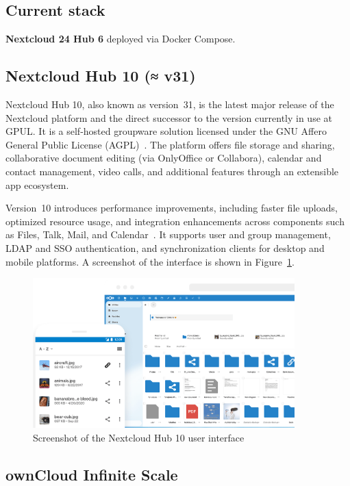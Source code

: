 \subsection*{Current stack}
\textbf{Nextcloud 24 Hub 6} deployed via Docker Compose.

\subsection*{Nextcloud Hub 10 (≈ v31)}

Nextcloud Hub 10, also known as version~31, is the latest major release of the Nextcloud platform and the direct successor to the version currently in use at GPUL. It is a self-hosted groupware solution licensed under the GNU Affero General Public License (AGPL)~\cite{nextcloud-docs}. The platform offers file storage and sharing, collaborative document editing (via OnlyOffice or Collabora), calendar and contact management, video calls, and additional features through an extensible app ecosystem.

Version~10 introduces performance improvements, including faster file uploads, optimized resource usage, and integration enhancements across components such as Files, Talk, Mail, and Calendar~\cite{nextcloud-blog}. It supports user and group management, LDAP and SSO authentication, and synchronization clients for desktop and mobile platforms. A screenshot of the interface is shown in Figure~\ref{fig:nextcloud-ui}.

\begin{figure}[H]
  \centering
  \includegraphics[width=0.9\textwidth]{imaxes/nextcloud-ui.png}
  \caption{Screenshot of the Nextcloud Hub 10 user interface}
  \label{fig:nextcloud-ui}
\end{figure}

\subsection*{ownCloud Infinite Scale}


